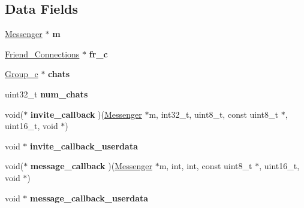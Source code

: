 \subsection*{Data Fields}
\begin{DoxyCompactItemize}
\item 
\hypertarget{struct_group___chats_aea6eb6c7c30a659f1b0dee83eaf03ea2}{\hyperlink{struct_messenger}{Messenger} $\ast$ {\bfseries m}}\label{struct_group___chats_aea6eb6c7c30a659f1b0dee83eaf03ea2}

\item 
\hypertarget{struct_group___chats_ae26eb43a606fff20fe70209d051c40f9}{\hyperlink{struct_friend___connections}{Friend\+\_\+\+Connections} $\ast$ {\bfseries fr\+\_\+c}}\label{struct_group___chats_ae26eb43a606fff20fe70209d051c40f9}

\item 
\hypertarget{struct_group___chats_a2a89a032b3d68d95f8cbecf4ecec9e74}{\hyperlink{struct_group__c}{Group\+\_\+c} $\ast$ {\bfseries chats}}\label{struct_group___chats_a2a89a032b3d68d95f8cbecf4ecec9e74}

\item 
\hypertarget{struct_group___chats_af6dc2bcdf8d71e0faaa6601befa94d9b}{uint32\+\_\+t {\bfseries num\+\_\+chats}}\label{struct_group___chats_af6dc2bcdf8d71e0faaa6601befa94d9b}

\item 
\hypertarget{struct_group___chats_a4ff3e6778b94fb9425a4b36572a0bf8b}{void($\ast$ {\bfseries invite\+\_\+callback} )(\hyperlink{struct_messenger}{Messenger} $\ast$m, int32\+\_\+t, uint8\+\_\+t, const uint8\+\_\+t $\ast$, uint16\+\_\+t, void $\ast$)}\label{struct_group___chats_a4ff3e6778b94fb9425a4b36572a0bf8b}

\item 
\hypertarget{struct_group___chats_a4a640f20c34159b06875274fedf9dc69}{void $\ast$ {\bfseries invite\+\_\+callback\+\_\+userdata}}\label{struct_group___chats_a4a640f20c34159b06875274fedf9dc69}

\item 
\hypertarget{struct_group___chats_a0f49e6a148c90647f5280d35d0f7a9d0}{void($\ast$ {\bfseries message\+\_\+callback} )(\hyperlink{struct_messenger}{Messenger} $\ast$m, int, int, const uint8\+\_\+t $\ast$, uint16\+\_\+t, void $\ast$)}\label{struct_group___chats_a0f49e6a148c90647f5280d35d0f7a9d0}

\item 
\hypertarget{struct_group___chats_a593c4aa670d5dc3d9fcd842fb8d5a6fe}{void $\ast$ {\bfseries message\+\_\+callback\+\_\+userdata}}\label{struct_group___chats_a593c4aa670d5dc3d9fcd842fb8d5a6fe}


\end{DoxyCompactItemize}
